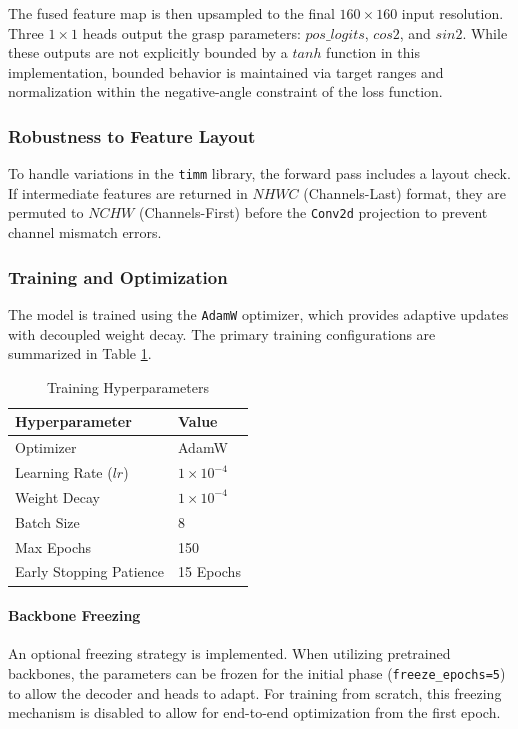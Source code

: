 The fused feature map is then upsampled to the final $160 \times 160$ input resolution. Three $1 \times 1$ heads output the grasp parameters: $pos\_logits$, $cos2$, and $sin2$. While these outputs are not explicitly bounded by a $tanh$ function in this implementation, bounded behavior is maintained via target ranges and normalization within the negative-angle constraint of the loss function.

\subsubsection{Robustness to Feature Layout}
To handle variations in the \texttt{timm} library, the forward pass includes a layout check. If intermediate features are returned in $NHWC$ (Channels-Last) format, they are permuted to $NCHW$ (Channels-First) before the \texttt{Conv2d} projection to prevent channel mismatch errors.
\clearpage

\subsubsection{Training and Optimization}
The model is trained using the \texttt{AdamW} optimizer, which provides adaptive updates with decoupled weight decay. The primary training configurations are summarized in Table \ref{tab:hyperparameters}.

\begin{table}[h]
\centering
\caption{Training Hyperparameters}
\label{tab:hyperparameters}
\begin{tabular}{ll}
\hline
\textbf{Hyperparameter} & \textbf{Value} \\ \hline
Optimizer               & AdamW          \\
Learning Rate ($lr$)    & $1 \times 10^{-4}$ \\
Weight Decay            & $1 \times 10^{-4}$ \\
Batch Size              & 8              \\
Max Epochs              & 150            \\
Early Stopping Patience & 15 Epochs      \\ \hline
\end{tabular}
\end{table}

\paragraph{Backbone Freezing}
An optional freezing strategy is implemented. When utilizing pretrained backbones, the parameters can be frozen for the initial phase (\texttt{freeze\_epochs=5}) to allow the decoder and heads to adapt. For training from scratch, this freezing mechanism is disabled to allow for end-to-end optimization from the first epoch.

